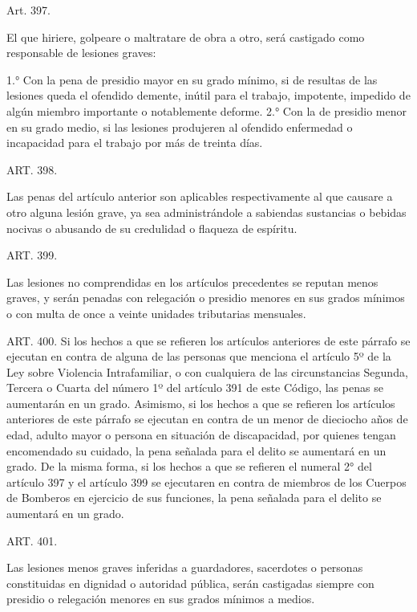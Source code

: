     Art. 397.

    El que hiriere, golpeare o maltratare de obra a otro, será castigado como responsable de lesiones graves:

    1.° Con la pena de presidio mayor en su grado mínimo, si de resultas de las lesiones queda el ofendido demente, inútil para el trabajo, impotente, impedido de algún miembro importante o notablemente deforme.
    2.° Con la de presidio menor en su grado medio, si las lesiones produjeren al ofendido enfermedad o incapacidad para el trabajo por más de treinta días.


    ART. 398.

    Las penas del artículo anterior son aplicables respectivamente al que causare a otro alguna lesión grave, ya sea administrándole a sabiendas sustancias o bebidas nocivas o abusando de su credulidad o flaqueza de espíritu.



    ART. 399.

    Las lesiones no comprendidas en los artículos precedentes se reputan menos graves, y serán penadas con relegación o presidio menores en sus grados mínimos o con multa de once a veinte unidades tributarias mensuales.








    ART. 400.
    Si los hechos a que se refieren los artículos anteriores de este párrafo se ejecutan en contra de alguna de las personas que menciona el artículo 5º de la Ley sobre Violencia Intrafamiliar, o con cualquiera de las circunstancias Segunda, Tercera o Cuarta del número 1º del artículo 391 de este Código, las penas se aumentarán en un grado.
    Asimismo, si los hechos a que se refieren los artículos anteriores de este párrafo se ejecutan en contra de un menor de dieciocho años de edad, adulto mayor o persona en situación de discapacidad, por quienes tengan encomendado su cuidado, la pena señalada para el delito se aumentará en un grado.
    De la misma forma, si los hechos a que se refieren el numeral 2° del artículo 397 y el artículo 399 se ejecutaren en contra de miembros de los Cuerpos de Bomberos en ejercicio de sus funciones, la pena señalada para el delito se aumentará en un grado.




    ART. 401.

    Las lesiones menos graves inferidas a guardadores, sacerdotes o personas constituidas en dignidad o autoridad pública, serán castigadas siempre con presidio o relegación menores en sus grados mínimos a medios.




